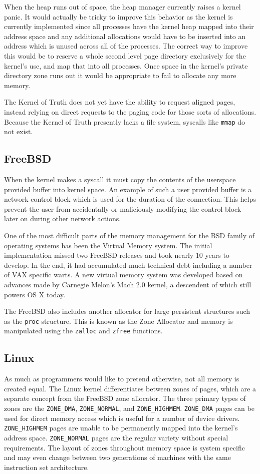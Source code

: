 \documentclass[10pt,conference,draftclsnofoot,onecolumn]{IEEEtran}
\begin{document}
When the heap runs out of space, the heap manager currently raises a kernel panic. It would actually be tricky to improve this behavior as the kernel is currently implemented since all processes have the kernel heap mapped into their address space and any additional allocations would have to be inserted into an address which is unused across all of the processes. The correct way to improve this would be to reserve a whole second level page directory exclusively for the kernel's use, and map that into all processes. Once space in the kernel's private directory zone runs out it would be appropriate to fail to allocate any more memory.

The Kernel of Truth does not yet have the ability to request aligned pages, instead relying on direct requests to the paging code for those sorts of allocations. Because the Kernel of Truth presently lacks a file system, syscalls like \texttt{mmap} do not exist.

\subsection{FreeBSD}
When the kernel makes a syscall it must copy the contents of the userspace provided buffer into kernel space. An example of such a user provided buffer is a network control block which is used for the duration of the connection. This helps prevent the user from accidentally or maliciously modifying the control block later on during other network actions.

One of the most difficult parts of the memory management for the BSD family of operating systems has been the Virtual Memory system. The initial implementation missed two FreeBSD releases and took nearly 10 years to develop. In the end, it had accumulated much technical debt including a number of VAX specific warts. A new virtual memory system was developed based on advances made by Carnegie Melon's Mach 2.0 kernel, a descendent of which still powers OS X today.

The FreeBSD also includes another allocator for large persistent structures such as the \texttt{proc} structure. This is known as the Zone Allocator and memory is manipulated using the \texttt{zalloc} and \texttt{zfree} functions.

\subsection{Linux}
As much as programmers would like to pretend otherwise, not all memory is created equal. The Linux kernel differentiates between zones of pages, which are a separate concept from the FreeBSD zone allocator. The three primary types of zones are the \texttt{ZONE\_DMA}, \texttt{ZONE\_NORMAL}, and \texttt{ZONE\_HIGHMEM}. \texttt{ZONE\_DMA} pages can be used for direct memory access which is useful for a number of device drivers. \texttt{ZONE\_HIGHMEM} pages are unable to be permanently mapped into the kernel's address space. \texttt{ZONE\_NORMAL} pages are the regular variety without special requirements. The layout of zones throughout memory space is system specific and may even change between two generations of machines with the same instruction set architecture.
\end{document}
